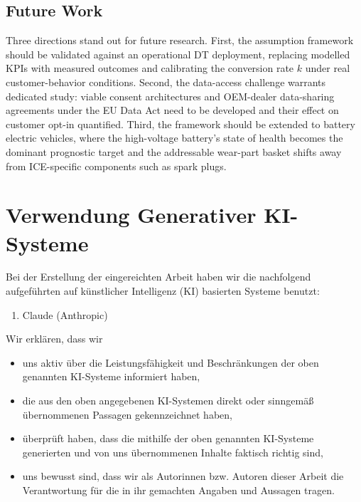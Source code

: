 \documentclass[conference,a4paper]{IEEEtran}
\begin{document}
\subsection{Future Work}\label{sec:future}

Three directions stand out for future research. First, the assumption framework
should be validated against an operational DT deployment, replacing modelled
KPIs with measured outcomes and calibrating the conversion rate $k$ under real
customer-behavior conditions. Second, the data-access challenge warrants
dedicated study: viable consent architectures and OEM-dealer data-sharing
agreements under the EU Data Act need to be developed and their effect on
customer opt-in quantified. Third, the framework should be extended to battery
electric vehicles, where the high-voltage battery's state of health becomes the
dominant prognostic target and the addressable wear-part basket shifts away from
ICE-specific components such as spark plugs.





 
\onecolumn
\newpage
\section*{Verwendung Generativer KI-Systeme}
 
Bei der Erstellung der eingereichten Arbeit haben wir die nachfolgend aufgeführten
auf künstlicher Intelligenz (KI) basierten Systeme benutzt:
 
\begin{enumerate}
  \item Claude (Anthropic)
\end{enumerate}
 
Wir erklären, dass wir
\begin{itemize}
  \item uns aktiv über die Leistungsfähigkeit und Beschränkungen der oben genannten
        KI-Systeme informiert haben,
  \item die aus den oben angegebenen KI-Systemen direkt oder sinngemäß übernommenen
        Passagen gekennzeichnet haben,
  \item überprüft haben, dass die mithilfe der oben genannten KI-Systeme generierten
        und von uns übernommenen Inhalte faktisch richtig sind,
  \item uns bewusst sind, dass wir als Autorinnen bzw. Autoren dieser Arbeit die
        Verantwortung für die in ihr gemachten Angaben und Aussagen tragen.
\end{itemize}
 
\end{document}
